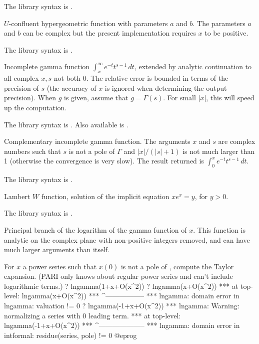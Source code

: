 The library syntax is .

\label{se:hyperu}
$U$-confluent hypergeometric function with
parameters $a$ and $b$. The parameters $a$ and $b$ can be complex but
the present implementation requires $x$ to be positive.

The library syntax is .

\label{se:incgam}
Incomplete gamma function $\int_x^\infty e^{-t}t^{s-1}\,dt$, extended by
analytic continuation to all complex $x, s$ not both $0$. The relative error
is bounded in terms of the precision of $s$ (the accuracy of $x$ is ignored
when determining the output precision). When $g$ is given, assume that
$g=\Gamma(s)$. For small $|x|$, this will speed up the computation.

The library syntax is .
Also available is .

\label{se:incgamc}
Complementary incomplete gamma function.
The arguments $x$ and $s$ are complex numbers such that $s$ is not a pole of
$\Gamma$ and $|x|/(|s|+1)$ is not much larger than 1 (otherwise the
convergence is very slow). The result returned is $\int_0^x
e^{-t}t^{s-1}\,dt$.

The library syntax is .

\label{se:lambertw}
Lambert $W$ function, solution of the implicit equation $xe^x=y$,
for $y > 0$.

The library syntax is .

\label{se:lngamma}
Principal branch of the logarithm of the gamma function of $x$. This
function is analytic on the complex plane with non-positive integers
removed, and can have much larger arguments than  itself.

For $x$ a power series such that $x(0)$ is not a pole of ,
compute the Taylor expansion. (PARI only knows about regular power series
and can't include logarithmic terms.)
\bprog
? lngamma(1+x+O(x^2))
? lngamma(x+O(x^2))
 ***   at top-level: lngamma(x+O(x^2))
 ***                 ^-----------------
 *** lngamma: domain error in lngamma: valuation != 0
? lngamma(-1+x+O(x^2))
 *** lngamma: Warning: normalizing a series with 0 leading term.
 ***   at top-level: lngamma(-1+x+O(x^2))
 ***                 ^--------------------
 *** lngamma: domain error in intformal: residue(series, pole) != 0
@eprog

